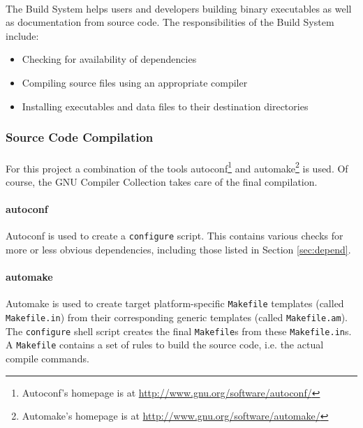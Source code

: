 \paragraph{}
The Build System helps users and developers building binary executables as well as documentation from source code. The responsibilities of the Build System include:

\begin{itemize}
\item Checking for availability of dependencies
\item Compiling source files using an appropriate compiler
\item Installing executables and data files to their destination directories
\end{itemize}

\subsubsection{Source Code Compilation}
\paragraph{}
For this project a combination of the tools autoconf\footnote{Autoconf's homepage is at \href{http://www.gnu.org/software/autoconf/}{http://www.gnu.org/software/autoconf/}} and automake\footnote{Automake's homepage is at \href{http://www.gnu.org/software/automake/}{http://www.gnu.org/software/automake/}} is used. Of course, the GNU Compiler Collection  takes care of the final compilation.

\paragraph{autoconf}
Autoconf is used to create a \texttt{configure} script. This contains various checks for more or less obvious dependencies, including those listed in Section \ref{sec:depend}.

\paragraph{automake}
Automake is used to create target platform-specific \texttt{Makefile} templates (called \texttt{Makefile.in}) from their corresponding generic templates (called \texttt{Makefile.am}). The \texttt{configure} shell script creates the final \texttt{Makefile}s from these \texttt{Makefile.in}s. A \texttt{Makefile} contains a set of rules to build the source code, i.e. the actual compile commands.

